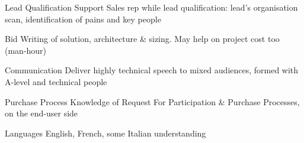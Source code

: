 

\begin{cvskills}

  \cvskill
    {Lead Qualification} %
    {Support Sales rep while lead qualification: lead's organisation scan, identification of pains and key people} %

  \cvskill
    {Bid} %
    {Writing of solution, architecture \& sizing. May help on project cost too (man-hour)} %

  \cvskill
    {Communication} %
    {Deliver highly technical speech to mixed audiences, formed with A-level and technical people} %

  \cvskill
    {Purchase Process} %
    {Knowledge of Request For Participation \& Purchase Processes, on the end-user side} %

  \cvskill
    {Languages} %
    {English, French, some Italian understanding} %

\end{cvskills}
